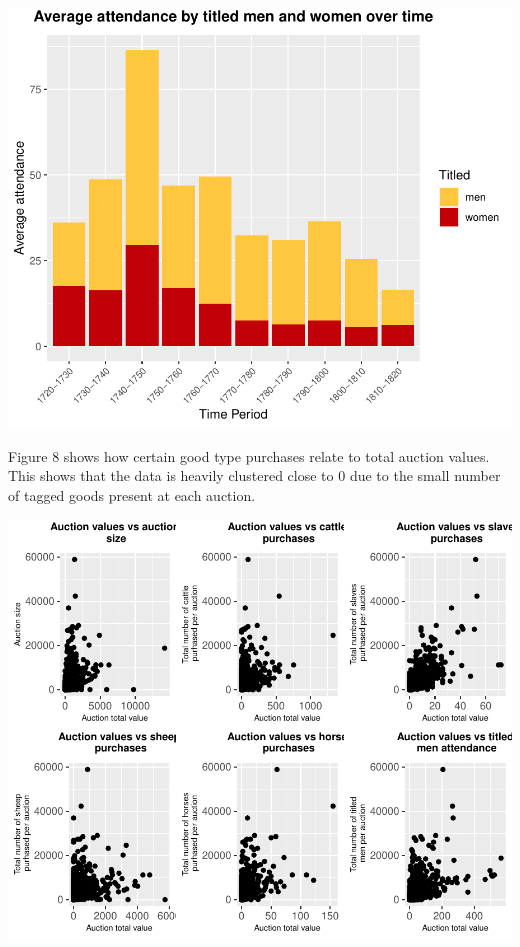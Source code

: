 \documentclass[11pt,preprint, authoryear]{elsarticle}
\numberwithin{equation}{section}
\numberwithin{figure}{section}
\numberwithin{table}{section}
\begin{document}
\begin{center}\includegraphics{Project_write_up_files/figure-latex/Figure7-1} \end{center}

Figure 8 shows how certain good type purchases relate to total auction
values. This shows that the data is heavily clustered close to 0 due to
the small number of tagged goods present at each auction.

\begin{center}\includegraphics{Project_write_up_files/figure-latex/Figure8-1} \end{center}
\end{document}
